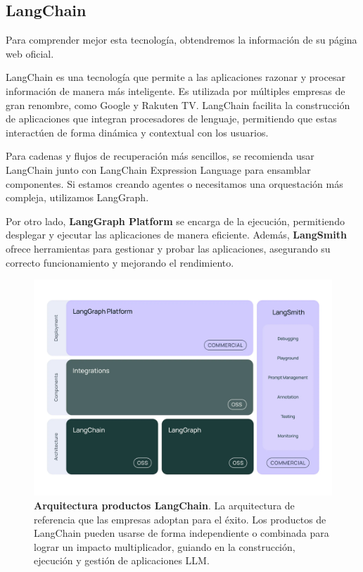\newpage

\subsection{LangChain}

Para comprender mejor esta tecnología, obtendremos la información  de su página web oficial.

LangChain es una tecnología que permite a las aplicaciones razonar y procesar información de manera más inteligente. Es utilizada por múltiples empresas de gran renombre, como Google y Rakuten TV. LangChain facilita la construcción de aplicaciones que integran procesadores de lenguaje, permitiendo que estas interactúen de forma dinámica y contextual con los usuarios.

Para cadenas y flujos de recuperación más sencillos, se recomienda usar LangChain junto con LangChain Expression Language para ensamblar componentes. Si estamos creando agentes o necesitamos una orquestación más compleja, utilizamos LangGraph.

Por otro lado, \textbf{LangGraph Platform} se encarga de la ejecución, permitiendo desplegar y ejecutar las aplicaciones de manera eficiente. Además, \textbf{LangSmith} ofrece herramientas para gestionar y probar las aplicaciones, asegurando su correcto funcionamiento y mejorando el rendimiento. \cite{PaginaLangChainOficial}



\begin{figure}[H]
    \centering
    \includegraphics[width=\linewidth]{imagenes/lg.jpg}
    \caption[\textbf{Arquitectura productos LangChain}.]{\textbf{Arquitectura productos LangChain}. La arquitectura de referencia que las empresas adoptan para el éxito. Los productos de LangChain pueden usarse de forma independiente o combinada para lograr un impacto multiplicador, guiando en la construcción, ejecución y gestión de aplicaciones LLM. \cite{PaginaLangChainOficial}}
    \label{productos-lang-chain}
\end{figure}



